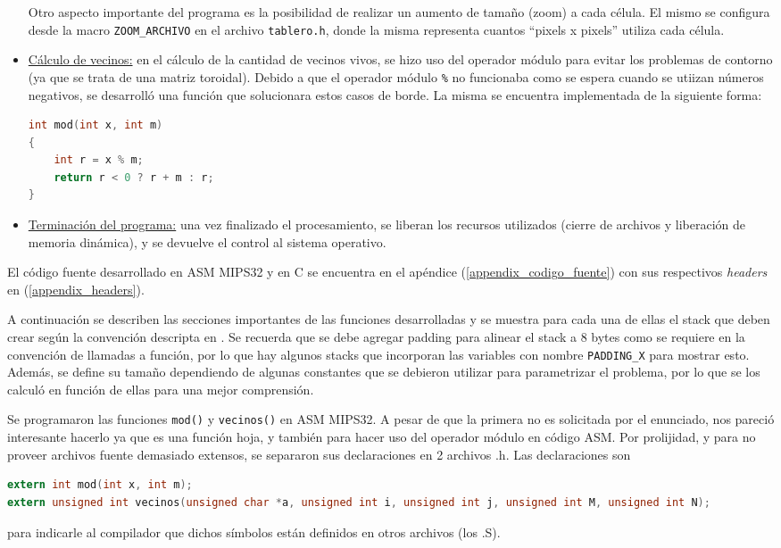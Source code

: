 \documentclass[a4paper,12pt]{article}
\newcommand{\quotes}[1]{``#1''}
\numberwithin{equation}{section}
\numberwithin{figure}{section}
\begin{document}
\begin{itemize}
	Otro aspecto importante del programa es la posibilidad de realizar un aumento de tamaño (zoom) a cada célula. El mismo se configura desde la macro \texttt{ZOOM\_ARCHIVO} en el archivo  \texttt{tablero.h}, donde la misma representa cuantos \quotes{pixels x pixels} utiliza cada célula.
	
	\item \underline{Cálculo de vecinos:} en el cálculo de la cantidad de vecinos vivos, se hizo uso del operador módulo para evitar los problemas de contorno (ya que se trata de una matriz toroidal). Debido a que el operador módulo \texttt{\%} no funcionaba como se espera cuando se utiizan números negativos, se desarrolló una función que solucionara estos casos de borde. La misma se encuentra implementada de la siguiente forma:
	\begin{lstlisting}[language=C, style=StyleC]
int mod(int x, int m)
{
	int r = x % m;
	return r < 0 ? r + m : r;
}
	\end{lstlisting}
		
	\item \underline{Terminación del programa:} una vez finalizado el procesamiento, se liberan los recursos utilizados (cierre de archivos y liberación de memoria dinámica), y se devuelve el control al sistema operativo.
	
\end{itemize}

El código fuente desarrollado en ASM MIPS32 y en C se encuentra en el apéndice (\ref{appendix_codigo_fuente}) con sus respectivos \emph{headers} en (\ref{appendix_headers}).

A continuación se describen las secciones importantes de las funciones desarrolladas y se muestra para cada una de ellas el stack que deben crear según la convención descripta en \cite{abi}. Se recuerda que se debe agregar padding para alinear el stack a 8 bytes como se requiere en la convención de llamadas a función, por lo que hay algunos stacks que incorporan las variables con nombre \texttt{PADDING\_X} para mostrar esto. Además, se define su tamaño dependiendo de algunas constantes que se debieron utilizar para parametrizar el problema, por lo que se los calculó en función de ellas para una mejor comprensión.

Se programaron las funciones \texttt{mod()} y \texttt{vecinos()} en ASM MIPS32. A pesar de que la primera no es solicitada por el enunciado, nos pareció interesante hacerlo ya que es una función hoja, y también para hacer uso del operador módulo en código ASM. Por prolijidad, y para no proveer archivos fuente demasiado extensos, se separaron sus declaraciones en 2 archivos .h. Las declaraciones son
\begin{lstlisting}[language=C, style=StyleC]
extern int mod(int x, int m);
extern unsigned int vecinos(unsigned char *a, unsigned int i, unsigned int j, unsigned int M, unsigned int N);
\end{lstlisting}
para indicarle al compilador que dichos símbolos están definidos en otros archivos (los .S). 
\end{document}
